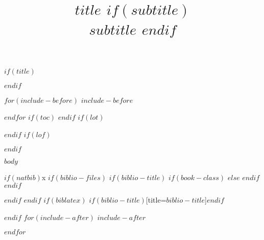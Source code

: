 \documentclass[12pt]{article}
\title{
	\vspace{0.5cm}
	{\fontsize{32}{36}\selectfont $title$}
	$if(subtitle)$
		\\\vspace{0.5em}
		{\fontsize{24}{28}\selectfont $subtitle$}
	$endif$
	\\\headrule
	\vspace{-2cm}
}
\date{}
\author{}
\begin{document}
$if(title)$\maketitle$endif$
\thispagestyle{fancyplain}

$for(include-before)$
$include-before$

$endfor$
$if(toc)$
{
\hypersetup{linkcolor=black}
\setcounter{tocdepth}{$toc-depth$}
\tableofcontents
}
$endif$
$if(lot)$
\listoftables
$endif$
$if(lof)$
\listoffigures
$endif$

$body$

$if(natbib)$x
$if(biblio-files)$
$if(biblio-title)$
$if(book-class)$
\renewcommand\bibname{$biblio-title$}
$else$
\renewcommand\refname{$biblio-title$}
$endif$
$endif$


$endif$
$endif$
$if(biblatex)$
\printbibliography$if(biblio-title)$[title=$biblio-title$]$endif$

$endif$
$for(include-after)$
$include-after$

$endfor$
\end{document}
